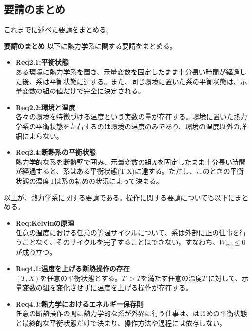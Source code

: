 \documentclass[a4paper,11pt]{jsarticle}
\numberwithin{equation}{section}
\begin{document}
\subsection{要請のまとめ}
これまでに述べた要請をまとめる。\\
\begin{itembox}[l]{\textbf{要請のまとめ}}
    以下に熱力学系に関する要請をまとめる。
    \begin{itemize}
        \item \textbf{Req2.1:平衡状態}\\
        ある環境に熱力学系を置き、示量変数を固定したまま十分長い時間が経過した後、系は平衡状態に達する。また、同じ環境に置いた系の平衡状態は、示量変数の組の値だけで完全に決定される。
        
        \item \textbf{Req2.2:環境と温度}\\
        各々の環境を特徴づける温度という実数の量が存在する。環境に置いた熱力学系の平衡状態を左右するのは環境の温度のみであり、環境の温度以外の詳細によらない。
        
        \item \textbf{Req2.4:断熱系の平衡状態}\\
        熱力学的な系を断熱壁で囲み、示量変数の組$X$を固定したまま十分長い時間が経過すると、系はある平衡状態(T,X)に達する。ただし、このときの平衡状態の温度Tは系の初めの状況によって決まる。
    \end{itemize}
    以上が、熱力学系に関する要請である。操作に関する要請についても以下にまとめる。
    \begin{itemize}
        \item \textbf{Req:Kelvinの原理}\\
        任意の温度における任意の等温サイクルについて、系は外部に正の仕事を行うことなく、そのサイクルを完了することはできない。すなわち、$W_{\text{cyc}} \leq 0$が成り立つ。
        
        \item \textbf{Req4.1:温度を上げる断熱操作の存在}\\
        $(T,X)$を任意の平衡状態とする。$T'>T$を満たす任意の温度$T'$に対して、示量変数の組を変化させずに温度を上げる操作が存在する。
        
        \item \textbf{Req4.3:熱力学におけるエネルギー保存則}\\
        任意の断熱操作の間に熱力学的な系が外界に行う仕事は、はじめの平衡状態と最終的な平衡状態だけで決まり、操作方法や過程には依存しない。
    \end{itemize}
\end{itembox}
\end{document}
